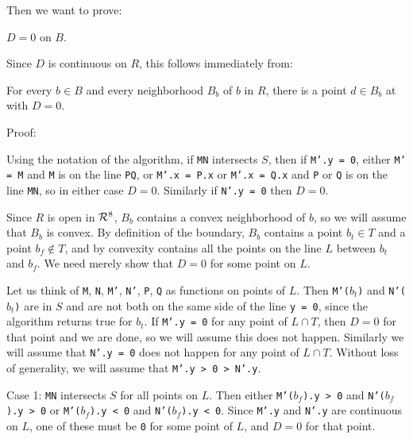 \documentclass[12pt]{article}
\begin{document}
Then we want to prove:
\begin{theorem}
$D = 0$ on $B$.
\end{theorem}

Since $D$ is continuous on $R$, this follows immediately from:
\begin{lemma}
For every $b\in B$ and every neighborhood $B_b$ of $b$ in $R$,
there is a point $d\in B_b$ at with $D=0$.
\end{lemma}

\begin{indpar}{0.3in}
Proof:

Using the notation of the algorithm, if {\tt MN} intersects $S$,
then if {\tt M'.y = 0}, either {\tt M' = M} and {\tt M} is on
the line {\tt PQ}, or {\tt M'.x = P.x} or {\tt M'.x = Q.x} and
{\tt P} or {\tt Q} is on the line {\tt MN}, so in either case
$D=0$.  Similarly if {\tt N'.y = 0} then $D=0$.

Since $R$ is open in ${\cal R}^8$, $B_b$ contains a
convex neighborhood of $b$, so we will assume that $B_b$ is
convex.  By definition of the boundary, $B_b$ contains a point
$b_t\in T$ and a point $b_f\not\in T$, and by convexity contains
all the points on the line $L$ between $b_t$ and $b_f$.
We need merely show that $D=0$ for some point on $L$.

Let us think of {\tt M}, {\tt N}, {\tt M'}, {\tt N'}, {\tt P}, {\tt Q}
as functions on points of $L$.  Then {\tt M'($b_t$)} and {\tt N'($b_t$)}
are in $S$ and are not both on the same side of the line {\tt y = 0},
since the algorithm returns true for $b_t$.  If {\tt M'.y = 0}
for any point of $L\cap T$, then $D=0$ for that point and we are done,
so we will assume this does not happen.  Similarly we will assume
that {\tt N'.y = 0} does not happen for any point of $L\cap T$.
Without loss of generality, we will assume that {\tt M'.y > 0 > N'.y}.

Case 1: {\tt MN} intersects $S$ for all points on $L$.
Then either {\tt M'($b_f$).y > 0} and {\tt N'($b_f$).y > 0} or
{\tt M'($b_f$).y < 0} and {\tt N'($b_f$).y < 0}.  Since
{\tt M'.y} and {\tt N'.y} are continuous on $L$, one of these
must be {\tt 0} for some point of $L$, and $D=0$ for that point.


\end{indpar}
\end{document}
